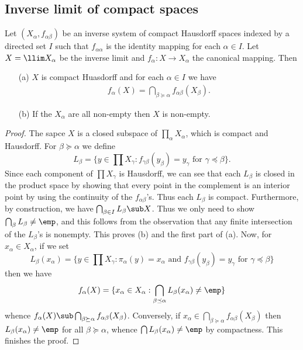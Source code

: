 \subsection{Inverse limit of compact spaces}
\begin{proposition}\label{topo space inverse limit of compact space prop}
Let $(X_\alpha,f_{\alpha\beta})$ be an inverse system of compact Hausdorff spaces indexed by a directed set $I$ such that $f_{\alpha\alpha}$ is the identity mapping for each $\alpha\in I$. Let $X=\llim X_\alpha$ be the inverse limit and $f_\alpha:X\to X_\alpha$ the canonical mapping. Then
\begin{itemize}
\item[(a)] $X$ is compact Huasdorff and for each $\alpha\in I$ we have
\begin{align}\label{topo space inverse limit of compact space prop-1}
f_\alpha(X)=\bigcap_{\beta\succeq\alpha}f_{\alpha\beta}(X_\beta).
\end{align}
\item[(b)] If the $X_\alpha$ are all non-empty then $X$ is non-empty.
\end{itemize}
\end{proposition}
\begin{proof}
The sapce $X$ is a closed subspace of $\prod_\alpha X_\alpha$, which is compact and Hausdorff. For $\beta\succeq\alpha$ we define
\[L_\beta=\{y\in \prod X_\gamma:\text{$f_{\gamma\beta}(y_\beta)=y_\gamma$ for $\gamma\preceq\beta$}\}.\]
Since each component of $\prod X_\gamma$ is Hausdorff, we can see that each $L_\beta$ is closed in the product space by showing that every point in the complement is an interior point by using the continuity of the $f_{\alpha\beta}$'s. Thus each $L_\beta$ is compact. Furthermore, by construction, we have $\bigcap_{\beta\in I}L_\beta\sub X$. Thus we only need to show $\bigcap_\beta L_\beta\neq\emp$, and this follows from the observation that any finite intersection of the $L_\beta$'s is nonempty. This proves (b) and the first part of (a). Now, for $x_\alpha\in X_\alpha$, if we set
\[L_\beta(x_\alpha)=\{y\in\prod X_\gamma:\text{$\pi_\alpha(y)=x_\alpha$ and $f_{\gamma\beta}(y_\beta)=y_\gamma$ for $\gamma\preceq\beta$}\}\]
then we have
\[f_\alpha(X)=\{x_\alpha\in X_\alpha:\bigcap_{\beta\preceq\alpha}L_\beta(x_\alpha)\neq\emp\}\]
whence $f_\alpha(X)\sub\bigcap_{\beta\succeq\alpha}f_{\alpha\beta}(X_\beta)$. Conversely, if $x_\alpha\in \bigcap_{\beta\succeq\alpha}f_{\alpha\beta}(X_\beta)$ then $L_\beta(x_\alpha)\neq\emp$ for all $\beta\succeq\alpha$, whence $\bigcap L_\beta(x_\alpha)\neq\emp$ by compactness. This finishes the proof.
\end{proof}
